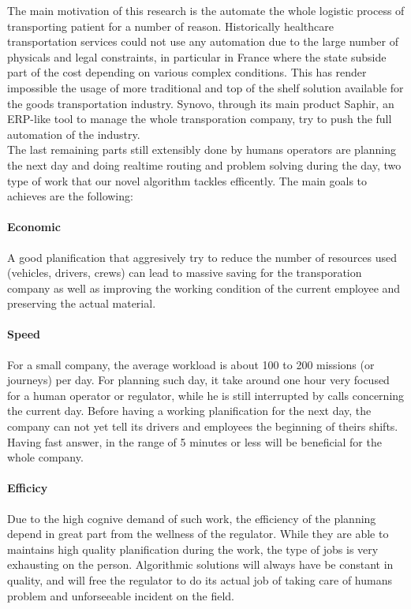 \documentclass[12pt]{memoir}
\begin{document}
\label{sec:Context of research}
The main motivation of this research is the automate the whole logistic process of
transporting patient for a number of reason. Historically healthcare transportation
services could not use any automation due to the large number of physicals and legal
constraints, in particular in France where the state subside part of the cost
depending on various complex conditions. This has render impossible the usage of
more traditional and top of the shelf solution available for the goods
transportation industry. Synovo, through its main product Saphir, an ERP-like tool
to manage the whole transporation company, try to push the full automation of the
industry. \\
The last remaining parts still extensibly done by humans operators are planning the
next day and doing realtime routing and problem solving during the day, two type of
work that our novel algorithm tackles efficently. The main goals to achieves are the
following:
\paragraph{Economic} %
\label{par:Economic}
A good planification that aggresively try to reduce the number of resources used
(vehicles, drivers, crews) can lead to massive saving for the transporation company
as well as improving the working condition of the current employee and preserving
the actual material.
\paragraph{Speed} %
\label{par:Speed}
For a small company, the average workload is about 100 to 200 missions (or journeys)
per day. For planning such day, it take around one hour very focused for a human
operator or regulator, while he is still interrupted by calls concerning the current
day. Before having a working planification for the next day, the company can not yet
tell its drivers and employees the beginning of theirs shifts. Having fast answer,
in the range of 5 minutes or less will be beneficial for the whole company.
\paragraph{Efficicy} %
\label{par:Efficicy}
Due to the high cognive demand of such work, the efficiency of the planning depend
in great part from the wellness of the regulator. While they are able to maintains
high quality planification during the work, the type of jobs is very exhausting on
the person. Algorithmic solutions will always have be constant in quality, and will
free the regulator to do its actual job of taking care of humans problem and
unforseeable incident on the field.
\end{document}
